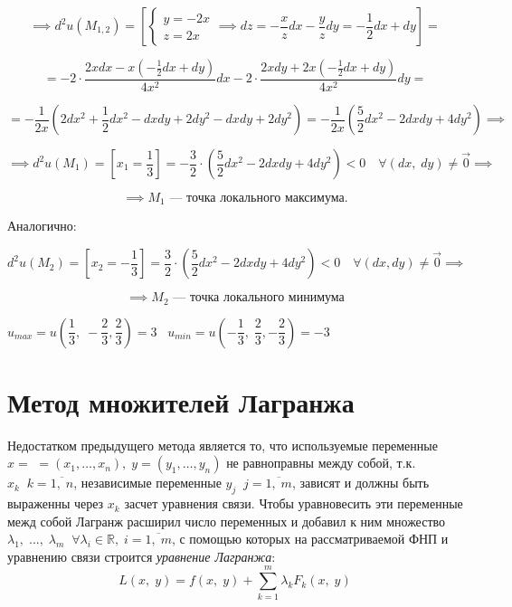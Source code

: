 \documentclass[../../main.tex]{subfiles}
\begin{document}
\begin{example}
	\[\implies d^2u\left(M_{1, 2}\right) = \left[
	\begin{cases}
	y = -2x\\
	z = 2x 
	\end{cases} \implies dz = -\dfrac{x}{z}dx - \dfrac{y}{z}dy = 
	-\dfrac{1}{2}dx + dy 
	\right] =\]
	
	\[= -2 \cdot \frac{2xdx - x\left(-\frac{1}{2}dx + dy\right)}{4x^2}dx - 
	2 \cdot \frac{2xdy + 2x \left(-\frac{1}{2}dx + dy\right)}{4x^2}dy =\]
	
	\[= -\dfrac{1}{2x}\left(2dx^2 + \dfrac{1}{2}dx^2 - dxdy + 2dy^2 - 
	dxdy + 2dy^2 \right) = -\dfrac{1}{2x} \left( \dfrac{5}
	{2} dx^2 - 2dxdy + 4dy^2 \right) \implies\]
	
	\[\implies d^2u\left(M_1\right) = \left[x_1 = \dfrac{1}{3}\right] = 
	-\dfrac{3}{2}\cdot\left(\dfrac{5}{2}dx^2 - 2dxdy + 
	4dy^2\right) < 0 \quad 
	\forall \left(dx, \; dy\right) \neq \vec{0} \implies\]
	
	\[\implies M_1 \text{~--- точка локального максимума}.\]
	
	Аналогично:
	
	\[d^2u \left(M_2\right) = \left[x_2 = -\dfrac{1}{3} \right] = 
	\dfrac{3}{2} \cdot \left( \dfrac{5}{2} dx^2 - 2dxdy + 4dy^2\right) < 0 
	\quad \forall \left(dx, dy\right) \neq \vec{0} \implies\]
	
	\[ \implies M_2 
	\text{~--- точка локального минимума}\]
	
	$u_{max} = u\left(\dfrac{1}{3}, \; -\dfrac{2}{3}, 
	\dfrac{2}{3}\right) = 3 \;\;\; 
	u_{min} = u\left(-\dfrac{1}{3}, \; 
	\dfrac{2}{3}, -\dfrac{2}{3}\right) = -3$ 
\end{example}

	\section{Метод множителей Лагранжа} 
	
	Недостатком предыдущего метода является то, что используемые переменные 
	$x = $ $=\left(x_1, \ldots, x_n\right), \; y = \left(y_1,\ldots, y_n\right)$
	не равноправны между собой, т.к. $x_k \;\; k = \overline{1,\; n}$, 
	независимые переменные $y_j \;\; j = \overline{1,\; m}$, зависят и 
	должны быть выраженны через $x_k$ засчет уравнения связи. 
	Чтобы уравновесить эти переменные межд собой Лагранж расширил 
	число переменных и добавил к ним множество 
	$\lambda_1,\; \ldots,\; \lambda_m \;\; \forall 
	\lambda_i \in \mathbb{R}, \; i = \overline{1,\; m}$, 
	с помощью которых на рассматриваемой ФНП и уравнению 
	связи строится \emph{уравнение Лагранжа}:
	\[
	L\left(x, \; y\right) = f\left(x, \; y\right) + \sum\limits_{k = 1}^m 
	\lambda_k F_k\left(x, \; y\right) \label{lec11.1:8}
	\]
	
\end{document}
